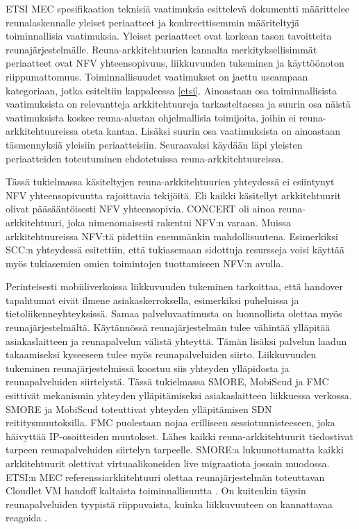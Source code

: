 ETSI MEC spesifikaation teknisiä vaatimuksia esittelevä dokumentti \cite{etsitechreq} määrittelee reunalaskennalle yleiset periaatteet ja konkreettisemmin määriteltyjä toiminnallisia vaatimuksia. 
Yleiset periaatteet ovat korkean tason tavoitteita reunajärjestelmälle.
Reuna-arkkitehtuurien kannalta merkityksellisimmät periaatteet ovat NFV yhteensopivuus, liikkuvuuden tukeminen ja käyttöönoton riippumattomuus.
Toiminnallisuudet vaatimukset on jaettu useampaan kategoriaan, jotka esiteltiin kappaleessa \ref{etsi}.
Ainoastaan osa toiminnallisista vaatimuksista on relevantteja arkkitehtuureja tarkasteltaessa ja suurin osa näistä vaatimuksista koskee reuna-alustan ohjelmallisia toimijoita, joihin ei reuna-arkkitehtuureissa oteta kantaa.
Lisäksi suurin osa vaatimuksista on ainoastaan täsmennyksiä yleisiin periaatteisiin.
Seuraavaksi käydään läpi yleisten periaatteiden toteutuminen ehdotetuissa reuna-arkkitehtuureissa.

Tässä tukielmassa käsiteltyjen reuna-arkkitehtuurien yhteydessä ei esiintynyt NFV yhteensopivuutta rajoittavia tekijöitä. Eli kaikki käsitellyt arkkitehtuurit olivat pääsääntöisesti NFV yhteensopivia.
CONCERT oli ainoa reuna-arkkitehtuuri, joka nimenomaisesti rakentui NFV:n varaan. Muissa arkkitehtuureissa NFV:tä pidettiin enemmänkin mahdollisuutena.
Esimerkiksi SCC:n yhteydessä esitettiin, että tukiasemaan sidottuja resursseja voisi käyttää myös tukiasemien omien toimintojen tuottamiseen NFV:n avulla. 


Perinteisesti mobiiliverkoissa liikkuvuuden tukeminen tarkoittaa, että handover tapahtumat eivät ilmene asiakaskerroksella, esimerkiksi puheluissa ja tietoliikenneyhteyksissä.
Samaa palveluvaatimusta on luonnollista olettaa myös reunajärjestelmältä. 
Käytännössä reunajärjestelmän tulee vähintää ylläpitää asiakaslaitteen ja reunapalvelun välistä yhteyttä.
Tämän lisäksi palvelun laadun takaamiseksi kyseeseen tulee myös reunapalveluiden siirto.
Liikkuvuuden tukeminen reunajärjestelmissä koostuu siis yhteyden ylläpidosta ja reunapalveluiden siirtelystä.
Tässä tukielmassa SMORE, MobiScud ja FMC esittivät mekanismin yhteyden ylläpitämiseksi asiakaslaitteen liikkuessa verkossa.
SMORE ja MobiScud toteuttivat yhteyden ylläpitämisen SDN reititysmuutoksilla.
FMC puolestaan nojaa erilliseen sessiotunnisteeseen, joka häivyttää IP-osoitteiden muutokset.
Lähes kaikki reuna-arkkitehtuurit tiedostivat tarpeen reunapalveluiden siirtelyn tarpeelle.
SMORE:a lukuunottamatta kaikki arkkitehtuurit olettivat virtuaalikoneiden live migraatiota jossain muodossa.  
ETSI:n MEC referenssiarkkitehtuuri olettaa reunajärjestelmän toteuttavan Cloudlet VM handoff kaltaista toiminnallisuutta \cite{etsirefarch}.
On kuitenkin täysin reunapalveluiden tyypistä riippuvaista, kuinka liikkuvuuteen on kannattavaa reagoida \cite{etsitechreq}. 

